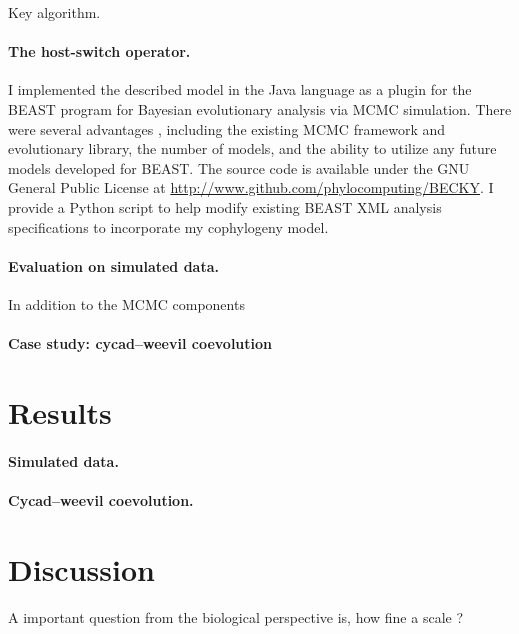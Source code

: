 \documentclass[12pt,letterpaper]{article}
\begin{document}
\begin{algorithm}
\caption{Key algorithm.}
\end{algorithm}

\paragraph*{The host-switch operator.}

I implemented the described model in the Java language as a plugin for the BEAST program \parencite{Drummond:2012} for Bayesian evolutionary analysis via \ac{MCMC} simulation. There were several advantages , including  the existing \ac{MCMC} framework and evolutionary library, the number of models, and the ability to utilize any future models developed for BEAST. The source code is available under the GNU General Public License at \url{http://www.github.com/phylocomputing/BECKY}. I provide a Python script to help modify existing BEAST XML analysis specifications to incorporate my cophylogeny model.

\paragraph*{Evaluation on simulated data.}
In addition to the MCMC components

\paragraph*{Case study: cycad--weevil coevolution}



\section*{Results}

\paragraph*{Simulated data.}

\paragraph*{Cycad--weevil coevolution.}

\section*{Discussion}

A important question from the biological perspective is, how fine a scale ? 
\end{document}
